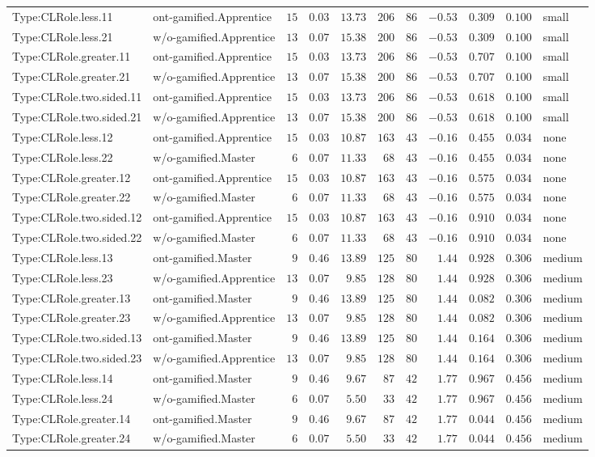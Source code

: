 \documentclass[6pt,a4paper]{article}
\begin{document}
{\begin{longtable}{llrrrrrrrrl}
Type:CLRole.less.11&ont-gamified.Apprentice&$15$&$0.03$&$13.73$&$206$&$ 86$&$-0.53$&$0.309$&$0.100$&small\tabularnewline
Type:CLRole.less.21&w/o-gamified.Apprentice&$13$&$0.07$&$15.38$&$200$&$ 86$&$-0.53$&$0.309$&$0.100$&small\tabularnewline
Type:CLRole.greater.11&ont-gamified.Apprentice&$15$&$0.03$&$13.73$&$206$&$ 86$&$-0.53$&$0.707$&$0.100$&small\tabularnewline
Type:CLRole.greater.21&w/o-gamified.Apprentice&$13$&$0.07$&$15.38$&$200$&$ 86$&$-0.53$&$0.707$&$0.100$&small\tabularnewline
Type:CLRole.two.sided.11&ont-gamified.Apprentice&$15$&$0.03$&$13.73$&$206$&$ 86$&$-0.53$&$0.618$&$0.100$&small\tabularnewline
Type:CLRole.two.sided.21&w/o-gamified.Apprentice&$13$&$0.07$&$15.38$&$200$&$ 86$&$-0.53$&$0.618$&$0.100$&small\tabularnewline
Type:CLRole.less.12&ont-gamified.Apprentice&$15$&$0.03$&$10.87$&$163$&$ 43$&$-0.16$&$0.455$&$0.034$&none\tabularnewline
Type:CLRole.less.22&w/o-gamified.Master&$ 6$&$0.07$&$11.33$&$ 68$&$ 43$&$-0.16$&$0.455$&$0.034$&none\tabularnewline
Type:CLRole.greater.12&ont-gamified.Apprentice&$15$&$0.03$&$10.87$&$163$&$ 43$&$-0.16$&$0.575$&$0.034$&none\tabularnewline
Type:CLRole.greater.22&w/o-gamified.Master&$ 6$&$0.07$&$11.33$&$ 68$&$ 43$&$-0.16$&$0.575$&$0.034$&none\tabularnewline
Type:CLRole.two.sided.12&ont-gamified.Apprentice&$15$&$0.03$&$10.87$&$163$&$ 43$&$-0.16$&$0.910$&$0.034$&none\tabularnewline
Type:CLRole.two.sided.22&w/o-gamified.Master&$ 6$&$0.07$&$11.33$&$ 68$&$ 43$&$-0.16$&$0.910$&$0.034$&none\tabularnewline
Type:CLRole.less.13&ont-gamified.Master&$ 9$&$0.46$&$13.89$&$125$&$ 80$&$ 1.44$&$0.928$&$0.306$&medium\tabularnewline
Type:CLRole.less.23&w/o-gamified.Apprentice&$13$&$0.07$&$ 9.85$&$128$&$ 80$&$ 1.44$&$0.928$&$0.306$&medium\tabularnewline
Type:CLRole.greater.13&ont-gamified.Master&$ 9$&$0.46$&$13.89$&$125$&$ 80$&$ 1.44$&$0.082$&$0.306$&medium\tabularnewline
Type:CLRole.greater.23&w/o-gamified.Apprentice&$13$&$0.07$&$ 9.85$&$128$&$ 80$&$ 1.44$&$0.082$&$0.306$&medium\tabularnewline
Type:CLRole.two.sided.13&ont-gamified.Master&$ 9$&$0.46$&$13.89$&$125$&$ 80$&$ 1.44$&$0.164$&$0.306$&medium\tabularnewline
Type:CLRole.two.sided.23&w/o-gamified.Apprentice&$13$&$0.07$&$ 9.85$&$128$&$ 80$&$ 1.44$&$0.164$&$0.306$&medium\tabularnewline
Type:CLRole.less.14&ont-gamified.Master&$ 9$&$0.46$&$ 9.67$&$ 87$&$ 42$&$ 1.77$&$0.967$&$0.456$&medium\tabularnewline
Type:CLRole.less.24&w/o-gamified.Master&$ 6$&$0.07$&$ 5.50$&$ 33$&$ 42$&$ 1.77$&$0.967$&$0.456$&medium\tabularnewline
Type:CLRole.greater.14&ont-gamified.Master&$ 9$&$0.46$&$ 9.67$&$ 87$&$ 42$&$ 1.77$&$0.044$&$0.456$&medium\tabularnewline
Type:CLRole.greater.24&w/o-gamified.Master&$ 6$&$0.07$&$ 5.50$&$ 33$&$ 42$&$ 1.77$&$0.044$&$0.456$&medium\tabularnewline

\end{longtable}}
\end{document}
